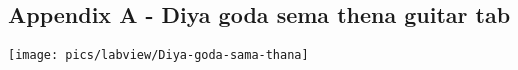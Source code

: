 \subsection*{Appendix A - Diya goda sema thena guitar tab }


\begin{center}
	\texttt{[image: pics/labview/Diya-goda-sama-thana]}
\end{center}

\pagebreak